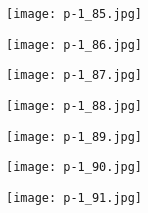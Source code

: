 \clearpage


\begin{figure}
    \begin{center}
        \texttt{[image: p-1\_85.jpg]}
        \caption{}
    \end{center}
\end{figure}

\clearpage


\begin{figure}
    \begin{center}
        \texttt{[image: p-1\_86.jpg]}
        \caption{}
    \end{center}
\end{figure}

\clearpage


\begin{figure}
    \begin{center}
        \texttt{[image: p-1\_87.jpg]}
        \caption{}
    \end{center}
\end{figure}

\clearpage


\begin{figure}
    \begin{center}
        \texttt{[image: p-1\_88.jpg]}
        \caption{}
    \end{center}
\end{figure}

\clearpage


\begin{figure}
    \begin{center}
        \texttt{[image: p-1\_89.jpg]}
        \caption{}
    \end{center}
\end{figure}

\clearpage


\begin{figure}
    \begin{center}
        \texttt{[image: p-1\_90.jpg]}
        \caption{}
    \end{center}
\end{figure}

\clearpage


\begin{figure}
    \begin{center}
        \texttt{[image: p-1\_91.jpg]}
        \caption{}
    \end{center}
\end{figure}

